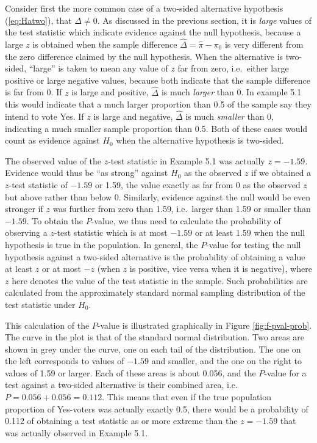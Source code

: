 \documentclass[11pt,a4paper,openany]{book}
\begin{document}
Consider first the more common case of a two-sided alternative
hypothesis (\ref{eq:Hatwo}), that \(\Delta\ne 0\). As discussed in the
previous section, it is \emph{large} values of the test statistic which
indicate evidence against the null hypothesis, because a large \(z\) is
obtained when the sample difference \(\hat{\Delta}=\hat{\pi}-\pi_{0}\)
is very different from the zero difference claimed by the null
hypothesis. When the alternative is two-sided, ``large'' is taken to
mean any value of \(z\) far from zero, i.e.~either large positive or
large negative values, because both indicate that the sample difference
is far from 0. If \(z\) is large and positive, \(\hat{\Delta}\) is much
\emph{larger} than 0. In example 5.1 this would indicate that a much
larger proportion than 0.5 of the sample say they intend to vote Yes. If
\(z\) is large and negative, \(\hat{\Delta}\) is much \emph{smaller}
than 0, indicating a much smaller sample proportion than 0.5. Both of
these cases would count as evidence against \(H_{0}\) when the
alternative hypothesis is two-sided.

The observed value of the \(z\)-test statistic in Example 5.1 was
actually \(z=-1.59\). Evidence would thus be ``as strong'' against
\(H_{0}\) as the observed \(z\) if we obtained a \(z\)-test statistic of
\(-1.59\) or 1.59, the value exactly as far from 0 as the observed \(z\)
but above rather than below 0. Similarly, evidence against the null
would be even stronger if \(z\) was further from zero than 1.59,
i.e.~larger than 1.59 or smaller than \(-1.59\). To obtain the
\(P\)-value, we thus need to calculate the probability of observing a
\(z\)-test statistic which is at most \(-1.59\) or at least 1.59 when
the null hypothesis is true in the population. In general, the
\(P\)-value for testing the null hypothesis against a two-sided
alternative is the probability of obtaining a value at least \(z\) or at
most \(-z\) (when \(z\) is positive, vice versa when it is negative),
where \(z\) here denotes the value of the test statistic in the sample.
Such probabilities are calculated from the approximately standard normal
sampling distribution of the test statistic under \(H_{0}\).

This calculation of the \(P\)-value is illustrated graphically in Figure
\ref{fig:f-pval-prob}. The curve in the plot is that of the standard
normal distribution. Two areas are shown in grey under the curve, one on
each tail of the distribution. The one on the left corresponds to values
of \(-1.59\) and smaller, and the one on the right to values of 1.59 or
larger. Each of these areas is about 0.056, and the \(P\)-value for a
test against a two-sided alternative is their combined area, i.e.
\(P=0.056+0.056=0.112\). This means that even if the true population
proportion of Yes-voters was actually exactly 0.5, there would be a
probability of 0.112 of obtaining a test statistic as or more extreme
than the \(z=-1.59\) that was actually observed in Example 5.1.
\end{document}
